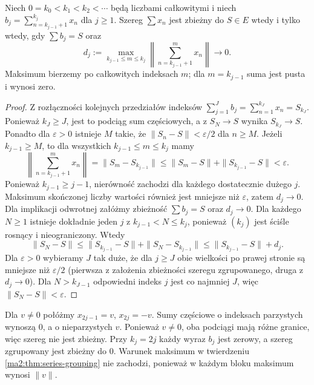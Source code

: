 \begin{twierdzenie}
\label{ma2:thm:series-grouping}
Niech $0=k_0<k_1<k_2<\cdots$ będą liczbami całkowitymi
i niech $b_j=\sum_{n=k_{j-1}+1}^{k_j}x_n$ dla $j\ge1$.
Szereg $\sum x_n$ jest zbieżny do $S\in E$ wtedy i tylko
wtedy, gdy $\sum b_j=S$ oraz
\[
 d_j:=\max_{k_{j-1}\le m\le k_j}
 \left\|\sum_{n=k_{j-1}+1}^{m}x_n\right\|\longrightarrow0.
\]
Maksimum bierzemy po całkowitych indeksach $m$; dla
$m=k_{j-1}$ suma jest pusta i wynosi zero.
\end{twierdzenie}
\begin{proof}
Z rozłączności kolejnych przedziałów indeksów
$\sum_{j=1}^J b_j=\sum_{n=1}^{k_J}x_n=S_{k_J}$.
Ponieważ $k_J\ge J$, jest to podciąg sum częściowych,
a z $S_N\to S$ wynika $S_{k_J}\to S$.
Ponadto dla $\varepsilon>0$ istnieje $M$ takie, że
$\|S_n-S\|<\varepsilon/2$ dla $n\ge M$. Jeżeli
$k_{j-1}\ge M$, to dla wszystkich $k_{j-1}\le m\le k_j$
mamy
\[
 \left\|\sum_{n=k_{j-1}+1}^m x_n\right\|
 =\|S_m-S_{k_{j-1}}\|
 \le\|S_m-S\|+\|S_{k_{j-1}}-S\|<\varepsilon.
\]
Ponieważ $k_{j-1}\ge j-1$, nierówność zachodzi dla każdego
dostatecznie dużego $j$. Maksimum skończonej liczby wartości
również jest mniejsze niż $\varepsilon$, zatem $d_j\to0$.
Dla implikacji odwrotnej załóżmy zbieżność $\sum b_j=S$
oraz $d_j\to0$.
Dla każdego $N\ge1$ istnieje dokładnie jeden $j$ z
$k_{j-1}<N\le k_j$, ponieważ $(k_j)$ jest ściśle rosnący
i nieograniczony. Wtedy
\[
 \|S_N-S\|\le\|S_{k_{j-1}}-S\|+
              \|S_N-S_{k_{j-1}}\|
 \le\|S_{k_{j-1}}-S\|+d_j.
\]
Dla $\varepsilon>0$ wybieramy $J$ tak duże, że dla $j\ge J$
obie wielkości po prawej stronie są mniejsze niż
$\varepsilon/2$ (pierwsza z założenia zbieżności szeregu
zgrupowanego, druga z $d_j\to0$).
Dla $N>k_{J-1}$ odpowiedni indeks $j$ jest co najmniej $J$,
więc $\|S_N-S\|<\varepsilon$.
\end{proof}
\begin{przyklad}
\label{ma2:ex:grouping-divergence}
Dla $v\ne0$ połóżmy $x_{2j-1}=v$, $x_{2j}=-v$.
Sumy częściowe o indeksach parzystych wynoszą $0$,
a o nieparzystych $v$. Ponieważ $v\ne0$, oba podciągi
mają różne granice, więc szereg nie jest zbieżny.
Przy $k_j=2j$ każdy wyraz $b_j$ jest zerowy,
a szereg zgrupowany jest zbieżny do $0$.
Warunek maksimum w twierdzeniu \ref{ma2:thm:series-grouping}
nie zachodzi, ponieważ w każdym bloku maksimum wynosi $\|v\|$.
\end{przyklad}


